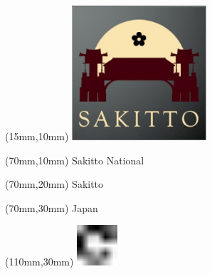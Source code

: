 \null\newpage
\begin{textblock*}{50mm}(15mm,10mm)%
\includegraphics[width=50mm]{LG/2015-05-20_00093.png}
\end{textblock*}
\begin{textblock*}{130mm}(70mm,10mm)%
{\fontsize{20}{20}\selectfont Sakitto National}\\
\end{textblock*}
\begin{textblock*}{120mm}(70mm,20mm)%
{\fontsize{16}{16}\selectfont Sakitto}\\
\end{textblock*}
\begin{textblock*}{120mm}(70mm,30mm)%
{\fontsize{12}{12}\selectfont Japan}
\end{textblock*}
\begin{textblock*}{30mm}(110mm,30mm)%
\centering
\includegraphics[height=15mm]{icons/fa-rotate-right.pdf}
\end{textblock*}
